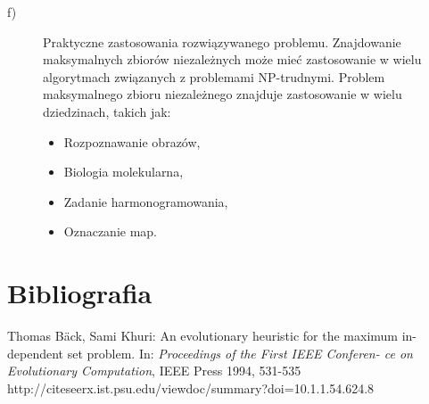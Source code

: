 \documentclass[11pt]{article}
\begin{document}
\begin{description}
\newpage
\item[f)] Praktyczne zastosowania rozwiązywanego problemu.\newline
Znajdowanie maksymalnych zbiorów niezależnych może mieć 
zastosowanie w wielu algorytmach związanych z problemami 
NP-trudnymi. \newline
Problem maksymalnego zbioru niezależnego znajduje 
zastosowanie w wielu dziedzinach, takich jak:
\begin{itemize}
\item Rozpoznawanie obrazów,\end{itemize}
\begin{itemize}
\item Biologia molekularna,\end{itemize}
\begin{itemize}
\item Zadanie harmonogramowania,\end{itemize}
\begin{itemize}
\item Oznaczanie map.\end{itemize}

\end{description}

\section{Bibliografia}

Thomas Bäck, Sami Khuri: An evolutionary heuristic for the maximum in-
dependent set problem. In: \textit{Proceedings of the First IEEE Conferen-
ce on Evolutionary Computation}, IEEE Press 1994, 531-535 
http://citeseerx.ist.psu.edu/viewdoc/summary?doi=10.1.1.54.624.8
\end{document}
